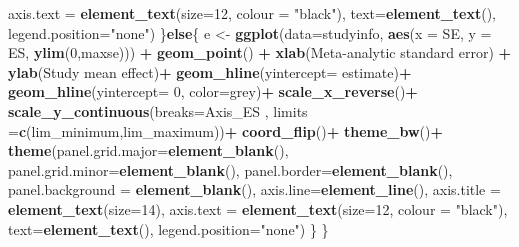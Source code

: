 \documentclass[
]{book}
\newenvironment{Shaded}{\begin{snugshade}}{\end{snugshade}}
\newcommand{\AttributeTok}[1]{\textcolor[rgb]{0.13,0.29,0.53}{#1}}
\newcommand{\ControlFlowTok}[1]{\textcolor[rgb]{0.13,0.29,0.53}{\textbf{#1}}}
\newcommand{\DecValTok}[1]{\textcolor[rgb]{0.00,0.00,0.81}{#1}}
\newcommand{\FunctionTok}[1]{\textcolor[rgb]{0.13,0.29,0.53}{\textbf{#1}}}
\newcommand{\NormalTok}[1]{#1}
\newcommand{\OtherTok}[1]{\textcolor[rgb]{0.56,0.35,0.01}{#1}}
\newcommand{\SpecialCharTok}[1]{\textcolor[rgb]{0.81,0.36,0.00}{\textbf{#1}}}
\newcommand{\StringTok}[1]{\textcolor[rgb]{0.31,0.60,0.02}{#1}}
\begin{document}
\begin{Shaded}
\begin{Highlighting}[]
            \AttributeTok{axis.text =} \FunctionTok{element\_text}\NormalTok{(}\AttributeTok{size=}\DecValTok{12}\NormalTok{, }\AttributeTok{colour =} \StringTok{"black"}\NormalTok{),}
            \AttributeTok{text=}\FunctionTok{element\_text}\NormalTok{(),}
            \AttributeTok{legend.position=}\StringTok{"none"}\NormalTok{)}
\NormalTok{    \}}\ControlFlowTok{else}\NormalTok{\{}
\NormalTok{      e }\OtherTok{\textless{}{-}} \FunctionTok{ggplot}\NormalTok{(}\AttributeTok{data=}\NormalTok{studyinfo, }\FunctionTok{aes}\NormalTok{(}\AttributeTok{x =}\NormalTok{ SE, }\AttributeTok{y =}\NormalTok{ ES, }\FunctionTok{ylim}\NormalTok{(}\DecValTok{0}\NormalTok{,maxse))) }\SpecialCharTok{+}
        \FunctionTok{geom\_point}\NormalTok{() }\SpecialCharTok{+}
        \FunctionTok{xlab}\NormalTok{(}\StringTok{\textquotesingle{}Meta{-}analytic standard error\textquotesingle{}}\NormalTok{) }\SpecialCharTok{+} \FunctionTok{ylab}\NormalTok{(}\StringTok{\textquotesingle{}Study mean effect\textquotesingle{}}\NormalTok{)}\SpecialCharTok{+}
        \FunctionTok{geom\_hline}\NormalTok{(}\AttributeTok{yintercept=}\NormalTok{ estimate)}\SpecialCharTok{+}
        \FunctionTok{geom\_hline}\NormalTok{(}\AttributeTok{yintercept=} \DecValTok{0}\NormalTok{, }\AttributeTok{color=}\StringTok{\textquotesingle{}grey\textquotesingle{}}\NormalTok{)}\SpecialCharTok{+}
        \FunctionTok{scale\_x\_reverse}\NormalTok{()}\SpecialCharTok{+}
        \FunctionTok{scale\_y\_continuous}\NormalTok{(}\AttributeTok{breaks=}\NormalTok{Axis\_ES , }\AttributeTok{limits =}\FunctionTok{c}\NormalTok{(lim\_minimum,lim\_maximum))}\SpecialCharTok{+}
        \FunctionTok{coord\_flip}\NormalTok{()}\SpecialCharTok{+}
        \FunctionTok{theme\_bw}\NormalTok{()}\SpecialCharTok{+}
        \FunctionTok{theme}\NormalTok{(}\AttributeTok{panel.grid.major=}\FunctionTok{element\_blank}\NormalTok{(),}
              \AttributeTok{panel.grid.minor=}\FunctionTok{element\_blank}\NormalTok{(),}
              \AttributeTok{panel.border=}\FunctionTok{element\_blank}\NormalTok{(),}
              \AttributeTok{panel.background =} \FunctionTok{element\_blank}\NormalTok{(),}
              \AttributeTok{axis.line=}\FunctionTok{element\_line}\NormalTok{(),}
              \AttributeTok{axis.title =} \FunctionTok{element\_text}\NormalTok{(}\AttributeTok{size=}\DecValTok{14}\NormalTok{),}
              \AttributeTok{axis.text =} \FunctionTok{element\_text}\NormalTok{(}\AttributeTok{size=}\DecValTok{12}\NormalTok{, }\AttributeTok{colour =} \StringTok{"black"}\NormalTok{),}
              \AttributeTok{text=}\FunctionTok{element\_text}\NormalTok{(),}
              \AttributeTok{legend.position=}\StringTok{"none"}\NormalTok{)}
\NormalTok{    \}}
\NormalTok{  \}}
  

\end{Highlighting}
\end{Shaded}
\end{document}
